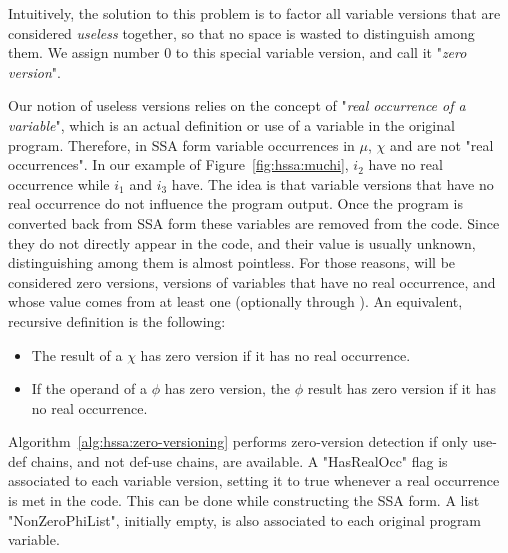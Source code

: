 Intuitively, the solution to this problem is to factor all variable versions that are considered \emph{useless} together, so that no space is wasted to distinguish among them. We assign number 0 to this special variable version, and call it "{\em zero version}".

Our notion of useless versions relies on the concept of "{\em real occurrence of a variable}", which is an actual definition or use of a variable in the original program. Therefore, in SSA form variable occurrences in $\mu$, $\chi$ and \phifuns are not "real occurrences". In our example of Figure~\ref{fig:hssa:muchi}, $i_2$ have no real occurrence while $i_1$ and $i_3$ have. The idea is that variable versions that have no real occurrence do not influence the program output. Once the program is converted back from SSA form these variables are removed from the code.
Since they do not directly appear in the code, and their value is usually unknown, distinguishing among them is almost pointless.
For those reasons, will be considered zero versions, versions of variables that have no real occurrence, and whose value  comes from at least one \chifun (optionally through \phifuns). An equivalent, recursive definition is the following:
\begin{itemize}
\item The result of a $\chi$ has zero version if it has no real occurrence.
\item If the operand of a $\phi$ has zero version, the $\phi$ result has zero version if it has no real occurrence.
\end{itemize}

Algorithm~\ref{alg:hssa:zero-versioning} performs zero-version detection if only use-def chains, and not def-use chains, are available. A "HasRealOcc" flag is associated to each variable version, setting it to true whenever a real occurrence is met in the code. This can be done while constructing the SSA form. A list "NonZeroPhiList", initially empty, is also associated to each original program variable.

